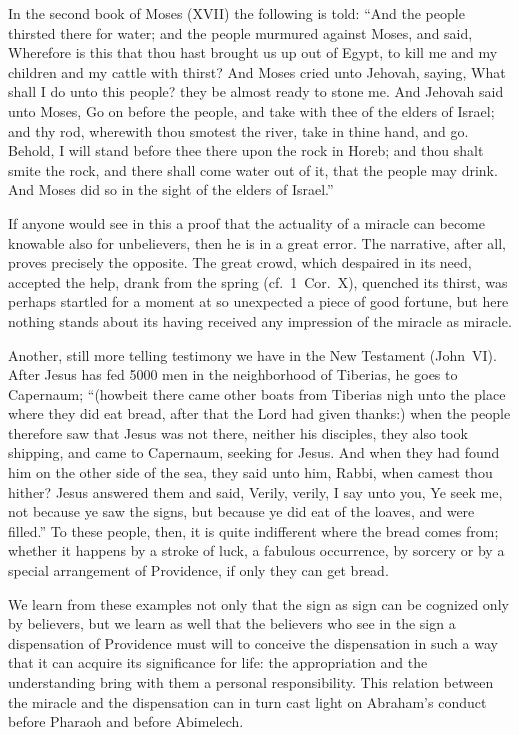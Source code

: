 \documentclass[12pt]{book}
\newcommand{\opage}[1]{\marginnote{\footnotesize\textit{[#1]}}}
\begin{document}
In the second book of Moses (XVII) the following is told: ``And the
people thirsted there for water; and the people murmured against Moses,
and said, Wherefore is this that thou hast brought us up out of Egypt,
to kill me and my children and my cattle with thirst? And Moses cried
unto Jehovah, saying, What shall I do unto this people? they be almost
ready to stone me. And Jehovah said unto Moses, Go on before the people,
and take with thee of the elders of Israel; and thy rod, wherewith thou
smotest the river, take in thine hand, and go. Behold, I will stand
before thee there upon the rock in Horeb; and thou shalt smite the rock,
and there shall come water out of it, that the people may drink. And
Moses did so in the sight of the elders of Israel.''

If anyone would see in this a proof that the actuality of a miracle can
become knowable also for unbelievers, then he is in a great error. The
narrative, after all, proves precisely the opposite. The great crowd,
which despaired in its need, accepted the help, drank from the spring
(cf.\ 1~Cor.~X), quenched its thirst, was perhaps startled for a moment
at so unexpected a piece of good fortune, but here nothing stands about
its having received any impression of the miracle as miracle.

Another, still more telling testimony we have in the New Testament
(John~VI). After Jesus has fed 5000 men in the neighborhood of Tiberias,
he goes to Capernaum; ``(howbeit there came other boats from Tiberias
nigh unto the place where they did eat bread, after that the Lord had
given thanks:) when the people therefore saw that Jesus was not there,
neither his disciples, they also took shipping, and came to Capernaum,
seeking for Jesus. And
\opage{216}\setcounter{footnote}{0}%
when they had found him on the other side of the sea, they said unto
him, Rabbi, when camest thou hither? Jesus answered them and said,
Verily, verily, I say unto you, Ye seek me, not because ye saw the
signs, but because ye did eat of the loaves, and were filled.'' To these
people, then, it is quite indifferent where the bread comes from;
whether it happens by a stroke of luck, a fabulous occurrence, by
sorcery or by a special arrangement of Providence, if only they can get
bread.

We learn from these examples not only that the sign as sign can be
cognized only by believers, but we learn as well that the believers who
see in the sign a dispensation of Providence must will to conceive the
dispensation in such a way that it can acquire its significance for
life: the appropriation and the understanding bring with them a personal
responsibility. This relation between the miracle and the dispensation
can in turn cast light on Abraham's conduct before Pharaoh and before
Abimelech.
\end{document}
